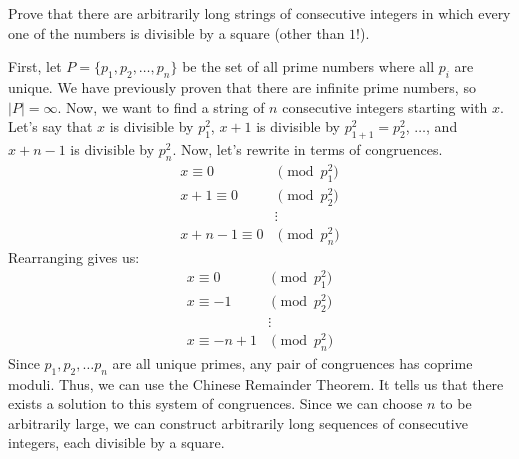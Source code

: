\documentclass{article}
\begin{document}
\begin{problem}{}{}
    Prove that there are arbitrarily long strings of consecutive integers in which every one of the numbers is divisible by a square (other than $1!$).
\end{problem}
\begin{solution}{}{}
    First, let $P=\{p_1,p_2,\dots,p_n\}$ be the set of all prime numbers where all $p_i$ are unique. We have previously proven that there are infinite prime numbers, so $|P|=\infty$. Now, we want to find a string of $n$ consecutive integers starting with $x$. Let's say that $x$ is divisible by $p_1^2$, $x+1$ is divisible by $p_{1+1}^2=p_{2}^2$, $\dots$, and $x+n-1$ is divisible by $p_{n}^2$. Now, let's rewrite in terms of congruences.
    \begin{align*}
        x \equiv 0 &\pmod{p_1^2} \\
        x+1 \equiv 0 &\pmod{p_2^2} \\
        &\vdots \\
        x+n-1 \equiv 0 &\pmod{p_n^2}
    \end{align*}
    Rearranging gives us:
    \begin{align*}
        x \equiv 0 &\pmod{p_1^2} \\
        x \equiv -1 &\pmod{p_2^2} \\
        &\vdots \\
        x \equiv -n+1 &\pmod{p_n^2}
    \end{align*}
    Since $p_1,p_2,\dots p_n$ are all unique primes, any pair of congruences has coprime moduli. Thus, we can use the Chinese Remainder Theorem. It tells us that there exists a solution to this system of congruences. Since we can choose $n$ to be arbitrarily large, we can construct arbitrarily long sequences of consecutive integers, each divisible by a square.
\end{solution}
\end{document}
